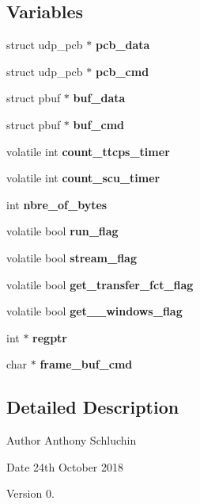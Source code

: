 \subsection*{Variables}
\begin{DoxyCompactItemize}
\item 
\mbox{\label{udp__peripheral_8c_ad82e4dd5f2bdcc51b68d9ecf90b6fe86}} 
struct udp\+\_\+pcb $\ast$ {\bfseries pcb\+\_\+data}
\item 
\mbox{\label{udp__peripheral_8c_aa3d0cb57350fe30a5927092475c0faa2}} 
struct udp\+\_\+pcb $\ast$ {\bfseries pcb\+\_\+cmd}
\item 
\mbox{\label{udp__peripheral_8c_a1fe64ecef353657c532741807aa947ca}} 
struct pbuf $\ast$ {\bfseries buf\+\_\+data}
\item 
\mbox{\label{udp__peripheral_8c_ae28b199c6f079cd3546d2263812f69e3}} 
struct pbuf $\ast$ {\bfseries buf\+\_\+cmd}
\item 
\mbox{\label{udp__peripheral_8c_a3d99f75279bc0e1ed6ae24ad1f92b3fb}} 
volatile int {\bfseries count\+\_\+ttcps\+\_\+timer}
\item 
\mbox{\label{udp__peripheral_8c_a6f03c2bee8cf4ef8c4319f1f60561ad1}} 
volatile int {\bfseries count\+\_\+scu\+\_\+timer}
\item 
\mbox{\label{udp__peripheral_8c_a5655744cbf3859b8d3279d4a3a22ce90}} 
int {\bfseries nbre\+\_\+of\+\_\+bytes}
\item 
\mbox{\label{udp__peripheral_8c_a4d1709746b2e7d35d9bef7ee11f2c790}} 
volatile bool {\bfseries run\+\_\+flag}
\item 
\mbox{\label{udp__peripheral_8c_ac285664a88629c304befd42daafc3f90}} 
volatile bool {\bfseries stream\+\_\+flag}
\item 
\mbox{\label{udp__peripheral_8c_af98df565a37a3db3fcafb5e66e062316}} 
volatile bool {\bfseries get\+\_\+transfer\+\_\+fct\+\_\+flag}
\item 
\mbox{\label{udp__peripheral_8c_ac3a118de77182fc96c16057fb7f75ec1}} 
volatile bool {\bfseries get\+\_\+\_\+windows\+\_\+flag}
\item 
\mbox{\label{udp__peripheral_8c_a39d2cad95814eb9635cca5310d914893}} 
int $\ast$ {\bfseries regptr}
\item 
\mbox{\label{udp__peripheral_8c_a1a1226656ce6fe65b369f5516caeb17a}} 
char $\ast$ {\bfseries frame\+\_\+buf\+\_\+cmd}
\end{DoxyCompactItemize}


\subsection{Detailed Description}
\begin{DoxyAuthor}{Author}
Anthony Schluchin 
\end{DoxyAuthor}
\begin{DoxyDate}{Date}
24th October 2018 
\end{DoxyDate}
\begin{DoxyVersion}{Version}
0. 
\end{DoxyVersion}


